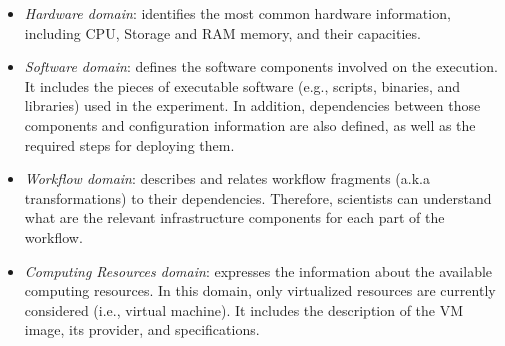 \begin{itemize}
	\setlength{\itemsep}{1pt}
	\setlength{\parskip}{0pt}
	\setlength{\parsep}{0pt}

	\item{\emph{Hardware domain}}: identifies the most common hardware information, 
		including CPU, Storage and RAM memory, and their capacities.
	
	\item{\emph{Software domain}}: defines the software components involved on the execution. 
    		It includes the pieces of executable software (e.g., scripts, binaries, and libraries) used in 
		the experiment. In addition, dependencies between those components and configuration 
		information are also defined, as well as the required steps for deploying them.
	
	\item{\emph{Workflow domain}}: describes and relates workflow fragments (a.k.a transformations) 
    		to their dependencies. Therefore, scientists can understand what are the relevant infrastructure 
		components for each part of the workflow.
	
	\item{\emph{Computing Resources domain}}: expresses the information about the available 
    		computing resources. In this domain, only virtualized resources are currently considered 
		(i.e., virtual machine). It includes the description of the VM image, its provider, and specifications.
\end{itemize}